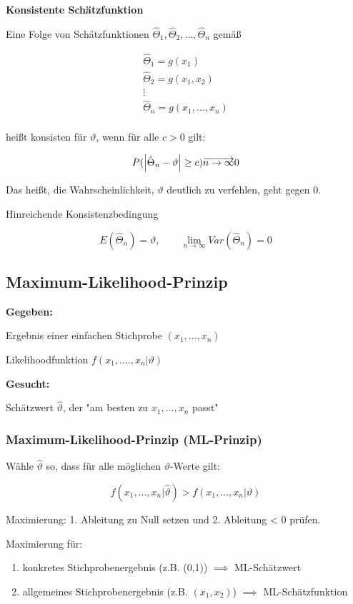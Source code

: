 \documentclass[a4paper]{article}
\begin{document}
\textbf{Konsistente Schätzfunktion}

Eine Folge von Schätzfunktionen $\hat{\Theta}_1, \hat{\Theta}_2, ..., \hat{\Theta}_n$ gemäß

\begin{align}
    \hat{\Theta}_1 = g(x_1) \\
    \hat{\Theta}_2 = g(x_1, x_2) \\
    \vdots\\
    \hat{\Theta}_n = g(x_1, ..., x_n) \\
\end{align}

heißt konsisten für $\vartheta$, wenn für alle $c > 0$ gilt:

\[
P(\left\lvert \hat{\Theta}_n - \vartheta \right\rvert \geq c) \overrightarrow{n\to\infty} 0
\]

Das heißt, die Wahrscheinlichkeit, $\vartheta$ deutlich zu verfehlen, geht gegen 0.

Hinreichende Konsistenzbedingung

\[
E(\hat{\Theta}_n) = \vartheta, \qquad \lim_{n\to\infty} Var(\hat{\Theta}_n) = 0
\]


\subsection{Maximum-Likelihood-Prinzip}

\textbf{Gegeben:}

Ergebnis einer einfachen Stichprobe $(x_1, ..., x_n)$

Likelihoodfunktion $f(x_1, ...., x_n | \vartheta)$

\textbf{Gesucht:}

Schätzwert $\hat{\vartheta}$, der "am besten zu $x_1, ..., x_n$ passt"

\subsubsection{Maximum-Likelihood-Prinzip (ML-Prinzip)}

Wähle $\hat{\vartheta} $ so, dass für alle möglichen $\vartheta$-Werte gilt:

\[
f(x_1, ..., x_n | \hat{\vartheta}) > f(x_1, ..., x_n | \vartheta)
\]

Maximierung: 1. Ableitung zu Null setzen und 2. Ableitung < 0 prüfen.

Maximierung für:

\begin{enumerate}
    \item konkretes Stichprobenergebnis (z.B. (0,1)) $\implies$ ML-Schätzwert
    \item allgemeines Stichprobenergebnis (z.B. $(x_1, x_2)$) $\implies$ ML-Schätzfunktion
\end{enumerate}
\end{document}
